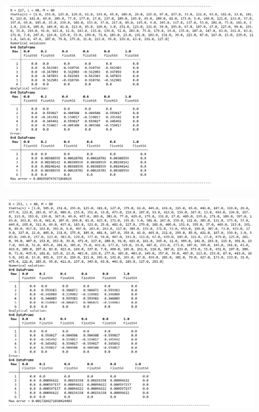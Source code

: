 \documentclass[12pt,a4paper, titlepage]{article}
\begin{document}
\begin{figure}[H]
	\centering
	\includegraphics[width = 1.0\textwidth]{lab5_3.png}
\end{figure}

\begin{figure}[H]
	\centering
	\includegraphics[width = 1.0\textwidth]{lab5_4.png}
\end{figure}
\end{document}

